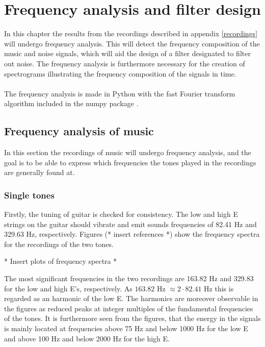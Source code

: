 \chapter{Frequency analysis and filter design}
In this chapter the results from the recordings described in appendix \ref{recordings} will undergo frequency analysis. This will detect the frequency composition of the music and noise signals, which will aid the design of a filter designated to filter out noise. The frequency analysis is furthermore necessary for the creation of spectrograms illustrating the frequency composition of the signals in time. \\ \\
The frequency analysis is made in Python with the fast Fourier transform algorithm included in the numpy package .
\section{Frequency analysis of music}
In this section the recordings of music will undergo frequency analysis, and the goal is to be able to express which frequencies the tones played in the recordings are generally found at.

\subsection{Single tones}
Firstly, the tuning of guitar is checked for consistency. The low and high E strings on the guitar should vibrate and emit sounds frequencies of 82.41 Hz and 329.63 Hz, respectively. Figures (* insert references *) show the frequency spectra for the recordings of the two tones.
\begin{center}
* Insert plots of frequency spectra *
\end{center}

The most significant frequencies in the two recordings are 163.82 Hz and 329.83 for the low and high E's, respectively. As $163.82$ Hz $\approx 2\cdot82.41$ Hz this is regarded as an harmonic of the low E. The harmonics are moreover observable in the figures as reduced peaks at integer multiples of the fundamental frequencies of the tones. It is furthermore seen from the figures, that the energy in the signals is mainly located at frequencies above 75 Hz and below 1000 Hz for the low E and above 100 Hz and below 2000 Hz for the high E.

